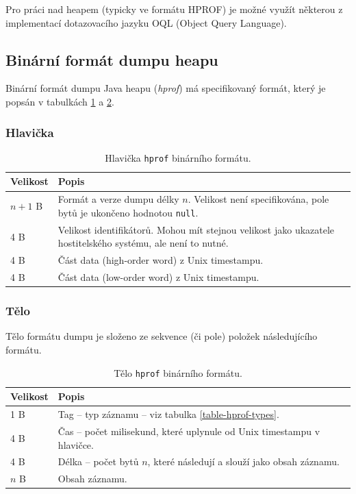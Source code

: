 Pro práci nad heapem  (typicky ve formátu HPROF) je možné využít některou z implementací dotazovacího jazyku OQL (Object Query Language).

\subsection{Binární formát dumpu heapu}
Binární formát dumpu Java heapu (\textit{hprof}) má specifikovaný formát, který je popsán v tabulkách \ref{table-hprof-header} a \ref{table-hprof-body}.

\subsubsection{Hlavička}
\begin{table}[ht!]
    \begin{tabularx}{\textwidth}{|l|X|}
        \hline
    \textbf{Velikost} & \textbf{Popis} \\ \hline \hline
    $n + 1$ B & Formát a verze dumpu délky $n$. Velikost není specifikována, pole bytů je ukončeno hodnotou \texttt{null}. \\
    4 B & Velikost identifikátorů. Mohou mít stejnou velikost jako ukazatele hostitelského systému, ale není to nutné. \\
    4 B & Část data (high-order word) z Unix timestampu. \\
    4 B & Část data (low-order word) z Unix timestampu.  \\ \hline                                                                   
    \end{tabularx}
    \caption{Hlavička \texttt{hprof} binárního formátu.}
    \label{table-hprof-header}
\end{table}

\subsubsection{Tělo}
Tělo formátu dumpu je složeno ze sekvence (či pole) položek následujícího formátu.
\begin{table}[ht!]
    \begin{tabularx}{\textwidth}{|l|X|}
        \hline
    \textbf{Velikost} & \textbf{Popis} \\ \hline \hline
    1 B & Tag -- typ záznamu -- viz tabulka \ref{table-hprof-types}. \\
    4 B & Čas -- počet milisekund, které uplynule od Unix timestampu v hlavičce. \\
    4 B & Délka -- počet bytů $n$, které následují a slouží jako obsah záznamu. \\
    $n$ B & Obsah záznamu. \\ \hline                                                                   
    \end{tabularx}
    \caption{Tělo \texttt{hprof} binárního formátu.}
    \label{table-hprof-body}
\end{table}


